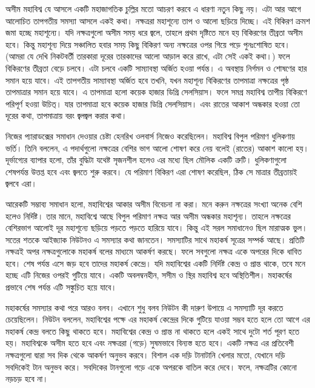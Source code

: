 \documentclass[
]{book}
\begin{document}
অসীম মহাবিশ্ব যে আসলে একটি মহাজাগতিক চুল্লির মতো আচরণ করবে এ ধারণা নতুন কিছু নয়। এটা আর আগে আলোচিত তাপগতীয় সমস্যা আসলে একই কথা। নক্ষত্ররা মহাশূন্যে তাপ ও আলো ছড়িয়ে দিচ্ছে। এই বিকিরণ ক্রমশ জমা হচ্ছে মহাশূন্যে। যদি নক্ষত্রগুলো অসীম সময় ধরে জ্বলে, তাহলে প্রথম দৃষ্টিতে মনে হয় বিকিরণের তীব্রতা অসীম হবে। কিন্তু মহাশূন্য দিয়ে সঞ্চালিত হবার সময় কিছু বিকিরণ অন্য নক্ষত্রের ওপর গিয়ে পড়ে পুনঃশোষিত হবে। (আমরা যে দেখি নিকটবর্তী তারকারা দূরের তারকাদের আলো আড়াল করে রাখে, এটা সেই একই কথা।) ফলে বিকিরণের তীব্রতা বেড়ে চলবে। এটা চলবে একটি সাম্যাবস্থা অর্জিত হওয়া পর্যন্ত। এ অবস্থায় নির্গমন ও শোষণের হার সমান হয়ে যাবে। এই তাপগতীয় সাম্যাবস্থা অর্জিত হবে তখনি, যখন মহাশূন্য বিকিরণের তাপমাত্রা নক্ষত্রের পৃষ্ঠ তাপমাত্রার সমান হয়ে যাবে। এ তাপমাত্রা হলো কয়েক হাজার ডিগ্রি সেলসিয়াস। ফলে সমগ্র মহাবিশ্ব তাপীয় বিকিরণে পরিপূর্ণ হওয়া উচিত্। যার তাপমাত্রা হবে কয়েক হাজার ডিগ্রি সেলসিয়াস। এবং রাতের আকাশ অন্ধকার হওয়া তো দূরের কথা, তাপমাত্রায় বরং জ্বলজ্বল করার কথা।

নিজের প্যারাডক্সের সমাধান দেওয়ার চেষ্টা হেনরিখ ওলবার্স নিজেও করেছিলেন। মহাবিশ্ব বিপুল পরিমাণ ধুলিকণায় ভর্তি। তিনি বললেন, এ পদার্থগুলো নক্ষত্রের বেশির ভাগ আলো শোষণ করে নেয় বলেই (রাতের) আকাশ কালো হয়। দূর্ভাগ্যের ব্যাপার হলো, তাঁর বুদ্ধিটা যথেষ্ট সৃজনশীল হলেও এর মধ্যে ছিল মৌলিক একটি ত্রুটি। ধুলিকণাগুলো শেষপর্যন্ত উত্তপ্ত হবে এবং জ্বলতে শুরু করবে। যে পরিমাণ বিকিরণ এরা শোষণ করেছিল, ঠিক সে মাত্রার তীব্রতায়ই জ্বলবে এরা।

আরেকটি সম্ভাব্য সমাধান হলো, মহাবিশ্বের আকার অসীম বিবেচনা না করা। মনে করুন নক্ষত্রের সংখ্যা অনেক বেশি হলেও নির্দিষ্ট। তার মানে, মহাবিশ্বে আছে বিপুল পরিমাণ নক্ষত্র আর অসীম অন্ধকার মহাশূন্য। তাহলে নক্ষত্রের বেশিরভাগ আলোই দূর মহাশূন্যে ছড়িয়ে পড়তে পড়তে হারিয়ে যাবে। কিন্তু এই সরল সমাধানেও ছিল মারাত্মক ভুল। সতের শতকে আইজ্যাক নিউটনও এ সমস্যার কথা জানতেন। সমস্যাটির সাথে মহাকর্ষ সূত্রের সম্পর্ক আছে। প্রতিটি নক্ষত্রই অপর নক্ষত্রগুলোকে মহাকর্ষ বলের মাধ্যমে আকর্ষণ করছে। ফলে সবগুলো নক্ষত্র একে অপরের দিকে ধাবিত হবে। শেষ পর্যন্ত এসে জড় হবে তাদের মহাকর্ষ কেন্দ্রে। যদি মহাবিশ্বের একটি নির্দিষ্ট কেন্দ্র ও প্রান্ত থাকে, তবে মনে হচ্ছে এটি নিজের ওপরই গুটিয়ে যাবে। একটি অবলম্বনহীন, সসীম ও স্থির মহাবিশ্ব হবে অস্থিতিশীল। মহাকর্ষের প্রভাবে শেষ পর্যন্ত এটি সঙ্কুচিত হয়ে যাবে।

মহাকর্ষের সমস্যার কথা পরে আরও বলব। এখানে শুধু বলব নিউটন কী দারুণ উপায়ে এ সমস্যাটি দূর করতে চেয়েছিলেন। নিউটন বললেন, মহাবিশ্বের পক্ষে এর মহাকর্ষ কেন্দ্রের দিকে গুটিয়ে যাওয়া সম্ভব হতে হলে তো আগে এর মহাকর্ষ কেন্দ্র বলতে কিছু থাকতে হবে। মহাবিশ্বের কেন্দ্র ও প্রান্ত না থাকতে হলে একই সাথে দুটো শর্ত পূরণ হতে হয়। মহাবিশ্বকে অসীম হতে হবে এবং নক্ষত্ররা (গড়ে) সুষমভাবে বিন্যস্ত হতে হবে। একটি নক্ষত্র এর প্রতিবেশী নক্ষত্রগুলো দ্বারা সব দিক থেকে আকর্ষণ অনুভব করবে। বিশাল এক দড়ি টানাটানি খেলার মতো, যেখানে দড়ি সবদিকেই টান অনুভব করে। সবদিকের টানগুলো গড়ে একে অপরকে বাতিল করে দেবে। ফলে, নক্ষত্রটির কোনো নড়চড় হবে না।
\end{document}
